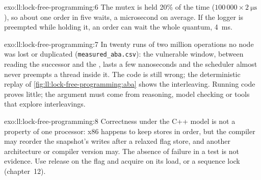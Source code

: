 \begin{solution}{exo:ll:lock-free-programming:6}
The mutex is held 20\% of the time ($100\,000 \times \qty{2}{\micro\second}$), so about one order in five waits, a microsecond
on average. If the logger is preempted while holding it, an order can wait the whole quantum, \qty{4}{\milli\second}.
\end{solution}

\begin{solution}{exo:ll:lock-free-programming:7}
In twenty runs of two million operations no node was lost or duplicated (\texttt{measured\_aba.csv}): the vulnerable window,
between reading the successor and the , lasts a few nanoseconds and the scheduler almost never preempts a
thread inside it. The code is still wrong; the deterministic replay of \cref{fig:ll:lock-free-programming:aba} shows the
interleaving. Running  code proves little; the argument must come from reasoning, model checking or tools that
explore interleavings.
\end{solution}

\begin{solution}{exo:ll:lock-free-programming:8}
Correctness under the C++ model is not a property of one processor: x86 happens to keep stores in order, but the compiler may
reorder the snapshot's writes after a relaxed flag store, and another architecture or compiler version may. The absence of
failure in a test is not evidence. Use release on the flag and acquire on its load, or a sequence lock (chapter~12).
\end{solution}

